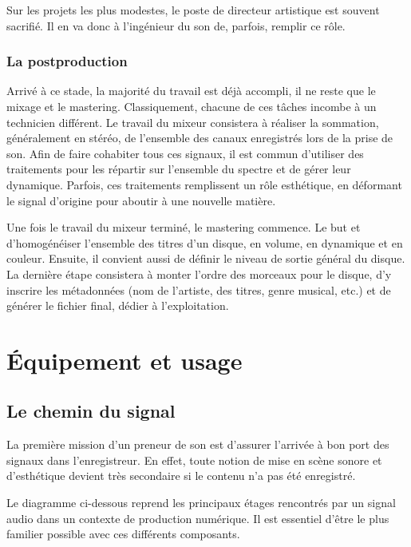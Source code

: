 \documentclass[
]{book}
\begin{document}
Sur les projets les plus modestes, le poste de directeur artistique est souvent sacrifié. Il en va donc à l'ingénieur du son de, parfois, remplir ce rôle.

\hypertarget{la-postproduction}{%
\section{La postproduction}\label{la-postproduction}}

Arrivé à ce stade, la majorité du travail est déjà accompli, il ne reste que le mixage et le mastering. Classiquement, chacune de ces tâches incombe à un technicien différent. Le travail du mixeur consistera à réaliser la sommation, généralement en stéréo, de l'ensemble des canaux enregistrés lors de la prise de son. Afin de faire cohabiter tous ces signaux, il est commun d'utiliser des traitements pour les répartir sur l'ensemble du spectre et de gérer leur dynamique. Parfois, ces traitements remplissent un rôle esthétique, en déformant le signal d'origine pour aboutir à une nouvelle matière.

Une fois le travail du mixeur terminé, le mastering commence. Le but et d'homogénéiser l'ensemble des titres d'un disque, en volume, en dynamique et en couleur. Ensuite, il convient aussi de définir le niveau de sortie général du disque. La dernière étape consistera à monter l'ordre des morceaux pour le disque, d'y inscrire les métadonnées (nom de l'artiste, des titres, genre musical, etc.) et de générer le fichier final, dédier à l'exploitation.

\hypertarget{part-uxe9quipement-et-usage}{%
\part{Équipement et usage}\label{part-uxe9quipement-et-usage}}

\hypertarget{le-chemin-du-signal}{%
\chapter{Le chemin du signal}\label{le-chemin-du-signal}}

La première mission d'un preneur de son est d'assurer l'arrivée à bon port des signaux dans l'enregistreur. En effet, toute notion de mise en scène sonore et d'esthétique devient très secondaire si le contenu n'a pas été enregistré.

Le diagramme ci-dessous reprend les principaux étages rencontrés par un signal audio dans un contexte de production numérique. Il est essentiel d'être le plus familier possible avec ces différents composants.
\end{document}
